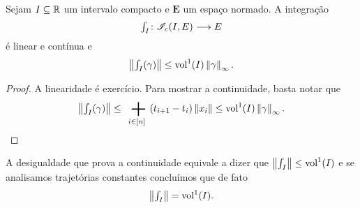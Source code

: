 \begin{proposition}
Sejam $I \subseteq \mathbb{R}$ um intervalo compacto e $\bm E$ um espaço normado. A integração
	\begin{equation*}
	\textstyle\int_I\colon \allowbreak \mathscr{I}_{c}(I,E) \longrightarrow E
	\end{equation*}
é linear e contínua e
	\begin{equation*}
	\left\Vert{\textstyle\int_I(\gamma)}\right\Vert \leq \operatorname{vol}^1(I) \left\Vert{\gamma}\right\Vert_{\infty}.
	\end{equation*}
\end{proposition}
\begin{proof}
A linearidade é exercício.
%
%
%
Para mostrar a continuidade, basta notar que
	\begin{equation*}
	\nor{\textstyle\int_I(\gamma)} \leq \sum_{i \in [n]} (t_{i+1}-t_i) \nor{x_i} \leq \vol^1(I)\norsup{\gamma}.
	\qedhere
	\end{equation*}
\end{proof}

A desigualdade que prova a continuidade equivale a dizer que $\left\Vert{\textstyle\int_I}\right\Vert \leq \operatorname{vol}^1(I)$ e se analisamos trajetórias constantes concluímos que de fato
	\begin{equation*}
	\left\Vert{\textstyle\int_I}\right\Vert = \operatorname{vol}^1(I).
	\end{equation*}


